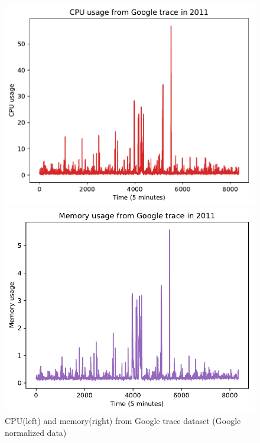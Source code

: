 \documentclass[runningheads]{llncs}
\begin{document}
\begin{figure}
	\centering
	\begin{minipage}[t]{6cm}
		\centering
		\includegraphics[width=1\textwidth =0cm 0cm 0cm 0cm]{images/pdf/google_cpu_5m.pdf}
	\end{minipage}
	\begin{minipage}[t]{6cm}
		\centering
		\includegraphics[width=1\textwidth =0cm 0cm 0cm 0cm]{images/pdf/google_ram_5m.pdf}
	\end{minipage}
	\caption{CPU(left) and memory(right) from Google trace dataset (Google normalized data) } 
	\label{fig_dataset}
\end{figure}
\end{document}
